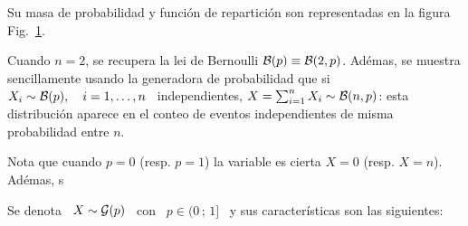 Su masa  de probabilidad  y funci\'on de  repartici\'on son representadas  en la
figura Fig.~\ref{Fig:MP:Binomial}.
%
\begin{figure}[h!]
\begin{center}  \end{center}
%
\label{Fig:MP:Binomial}
\end{figure}

Cuando  $n  = 2$,  se  recupera  la lei  de  Bernoulli  $\mathcal{B}(p) \equiv  \mathcal{B}(2,p)$.
Ad\'emas, se muestra  sencillamente usando la generadora de  probabilidad que si
$X_i \sim \mathcal{B}(p),  \quad i = 1,  \ldots , n$ \ independientes,  $X = \sum_{i=1}^n
X_i  \sim  \mathcal{B}(n,p)$:  esta  distribuci\'on  aparece  en  el  conteo  de  eventos
independientes de misma probabilidad entre $n$.

Nota que cuando $p = 0$ (resp. $p = 1$) la variable es cierta $X = 0$ (resp.  $X
= n$).  Ad\'emas, s





Se  denota  \  $X  \sim \mathcal{G}(p)$  \  con  \  $p  \in  (0  \,  ; \,  1]$  \  y  sus
caracter\'isticas son las siguientes:

